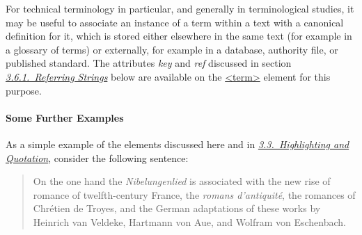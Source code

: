 For technical terminology in particular, and generally in terminological studies, it may be useful to associate an instance of a term within a text with a canonical definition for it, which is stored either elsewhere in the same text (for example in a glossary of terms) or externally, for example in a database, authority file, or published standard. The attributes {\itshape key} and {\itshape ref} discussed in section \textit{\hyperref[CONARS]{3.6.1.\ Referring Strings}} below are available on the \hyperref[TEI.term]{<term>} element for this purpose.
\paragraph[{Some Further Examples}]{Some Further Examples}\label{COHTGEG}\par
As a simple example of the elements discussed here and in \textit{\hyperref[COHQ]{3.3.\ Highlighting and Quotation}}, consider the following sentence: 
\begin{quote}On the one hand the \textit{Nibelungenlied} is associated with the new rise of romance of twelfth-century France, the \textit{romans d'antiquité}, the romances of Chrétien de Troyes, and the German adaptations of these works by Heinrich van Veldeke, Hartmann von Aue, and Wolfram von Eschenbach.\end{quote}
